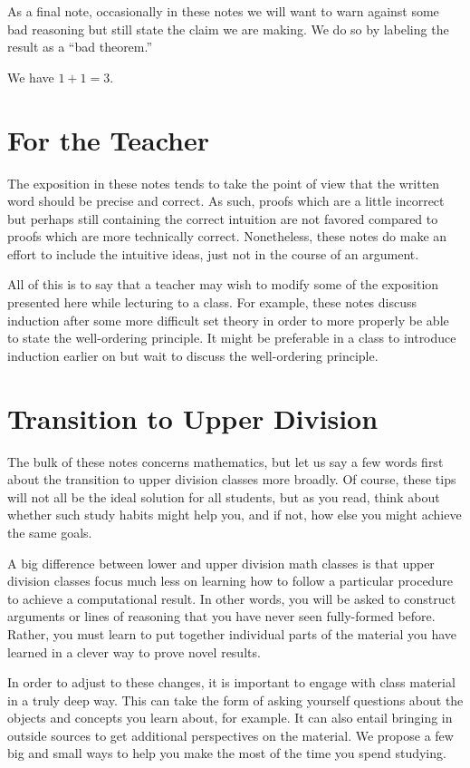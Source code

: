 \documentclass[../main.tex]{subfiles}
\begin{document}
As a final note, occasionally in these notes we will want to warn against some bad reasoning but still state the claim we are making. We do so by labeling the result as a ``bad theorem.''
\begin{badtheorem}
    We have $1+1=3$.
\end{badtheorem}

\section{For the Teacher}
The exposition in these notes tends to take the point of view that the written word should be precise and correct. As such, proofs which are a little incorrect but perhaps still containing the correct intuition are not favored compared to proofs which are more technically correct. Nonetheless, these notes do make an effort to include the intuitive ideas, just not in the course of an argument.

All of this is to say that a teacher may wish to modify some of the exposition presented here while lecturing to a class. For example, these notes discuss induction after some more difficult set theory in order to more properly be able to state the well-ordering principle. It might be preferable in a class to introduce induction earlier on but wait to discuss the well-ordering principle.

\section{Transition to Upper Division}
The bulk of these notes concerns mathematics, but let us say a few words first about the transition to upper division classes more broadly. Of course, these tips will not all be the ideal solution for all students, but as you read, think about whether such study habits might help you, and if not, how else you might achieve the same goals.

A big difference between lower and upper division math classes is that upper division classes focus much less on learning how to follow a particular procedure to achieve a computational result. In other words, you will be asked to construct arguments or lines of reasoning that you have never seen fully-formed before. Rather, you must learn to put together individual parts of the material you have learned in a clever way to prove novel results.

In order to adjust to these changes, it is important to engage with class material in a truly deep way. This can take the form of asking yourself questions about the objects and concepts you learn about, for example. It can also entail bringing in outside sources to get additional perspectives on the material. We propose a few big and small ways to help you make the most of the time you spend studying.
\end{document}
